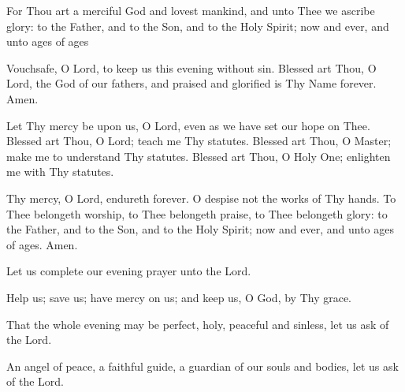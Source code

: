 \documentclass[twoside, letterpaper, 12pt]{report}
\begin{document}
\begin{priest}
\item For Thou art a merciful God and lovest mankind, and unto Thee we ascribe glory:
    to the Father, and to the Son, and to the Holy Spirit; now and ever, and unto ages of ages
\end{priest}



Vouchsafe, O Lord, to keep us this evening without sin.
Blessed art Thou, O Lord, the God of our fathers,
and praised and glorified is Thy Name forever. Amen.

Let Thy mercy be upon us, O Lord, even as we have set our hope on Thee.
Blessed art Thou, O Lord; teach me Thy statutes. Blessed art Thou, O Master;
make me to understand Thy statutes.
Blessed art Thou, O Holy One; enlighten me with Thy statutes.

Thy mercy, O Lord, endureth forever. O despise not the works of Thy hands.
To Thee belongeth worship, to Thee belongeth praise, to Thee belongeth glory:
to the Father, and to the Son, and to the Holy Spirit;
now and ever, and unto ages of ages. Amen.


\begin{deacon}
\item Let us complete our evening prayer unto the Lord.
\end{deacon}

\begin{deacon}
\item Help us; save us; have mercy on us; and keep us, O God, by Thy grace.
\end{deacon}

\begin{deacon}
\item That the whole evening may be perfect, holy, peaceful and sinless,
    let us ask of the Lord.
\end{deacon}


\begin{deacon}
\item An angel of peace, a faithful guide, a guardian of our souls and bodies,
    let us ask of the Lord.
\end{deacon}
\end{document}
